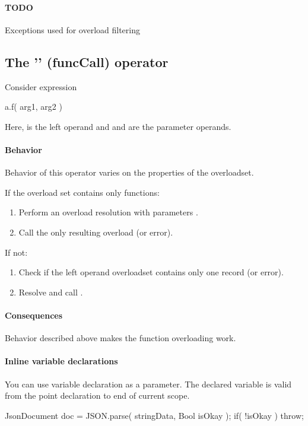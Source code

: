 \paragraph{TODO} Exceptions used for overload filtering

\subsection{The '' (funcCall) operator}
Consider expression
\begin{code}
a.f( arg1, arg2 )
\end{code}

Here,  is the left operand and  and  are the parameter operands.

\paragraph{Behavior}
Behavior of this operator varies on the properties of the overloadset.

If the overload set contains only functions:
\begin{enumerate}
	\item Perform an overload resolution with parameters .
	\item Call the only resulting overload (or error).
\end{enumerate}

If not:
\begin{enumerate}
	\item Check if the left operand overloadset contains only one record (or error).
	\item Resolve and call .
\end{enumerate}

\paragraph{Consequences}
Behavior described above makes the function overloading work.

\paragraph{Inline variable declarations}
You can use variable declaration as a parameter. The declared variable is valid from the point declaration to end of current scope.
\begin{code}
{
	JsonDocument doc = JSON.parse( stringData, Bool isOkay );
	if( !isOkay )
		throw;
}
\end{code}

